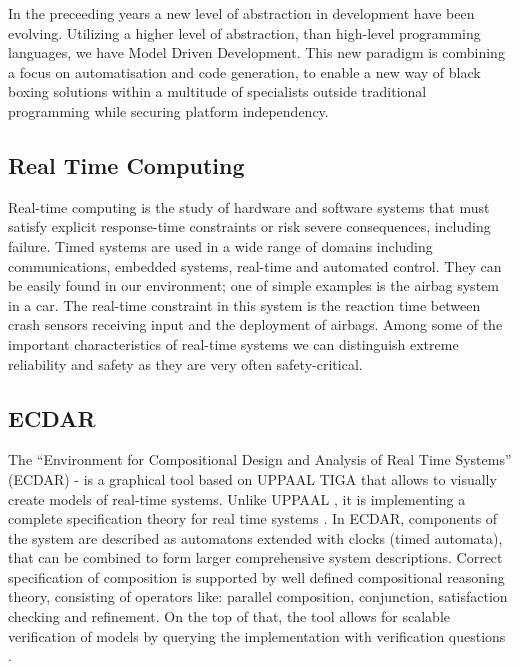 In the preceeding years a new level of abstraction in development have been evolving. Utilizing a higher level of abstraction, than high-level programming languages, we have Model Driven Development. This new paradigm is combining a focus on automatisation and code generation, to enable a new way of black boxing solutions within a multitude of specialists outside traditional programming while securing platform independency.  

\subsection {Real Time Computing \label{introduction-rts}}
%
Real-time computing is the study of hardware and software systems that must satisfy explicit 
response-time constraints or risk severe consequences, including failure. Timed systems are 
used in a wide range of domains including communications, embedded systems, real-time and automated control. 
They can be easily found in our environment; one of simple examples is the airbag system in a car. 
The real-time constraint in this system is the reaction time between crash sensors receiving input and 
the deployment of airbags. Among some of the important characteristics of real-time systems we can distinguish 
extreme reliability and safety as they are very often safety-critical.    

\subsection{ECDAR \label{introduction-ecdar}}
%
The “Environment for Compositional Design and Analysis of Real Time Systems” (ECDAR) - is a graphical tool based on UPPAAL TIGA \cite{behrmann_uppaal-tiga:_2006} that 
allows to visually create models of real-time systems. Unlike UPPAAL \cite{larsen_uppaal_1997}, it is implementing a complete specification theory for 
real time systems \cite{David:2010:TIA:1755952.1755967,conf/atva/DavidLLNW10}. In ECDAR, components of the system are described as automatons extended with clocks (timed automata), 
that can be combined to form larger comprehensive system descriptions. Correct specification of composition is supported by 
well defined compositional reasoning theory, consisting of operators like: parallel composition, conjunction, satisfaction 
checking and refinement. On the top of that, the tool allows for scalable verification of models by querying the 
implementation with verification questions \cite{conf/atva/DavidLLNW10}.
%

